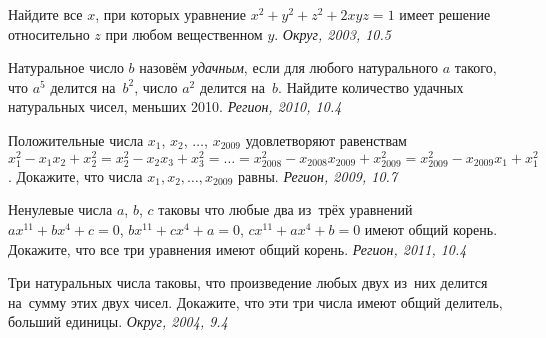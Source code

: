 \begin{problems}

\item
Найдите все $x$, при которых уравнение $x^2 + y^2 + z^2 + 2 x y z = 1$
имеет решение относительно $z$ при любом вещественном $y$.
\emph{\small Округ, 2003, 10.5}

\item
Натуральное число $b$ назовём \emph{удачным}, если для любого натурального $a$
такого, что $a^5$ делится на~$b^2$, число $a^2$ делится на~$b$.
Найдите количество удачных натуральных чисел, меньших 2010.
\emph{\small Регион, 2010, 10.4}

\item
Положительные числа $x_1$, $x_2$, $\ldots$, $x_{2009}$ удовлетворяют равенствам
\(
    x_1^2 - x_1 x_2 + x_2^2
=
    x_2^2 - x_2 x_3 + x_3^2
= \ldots =
    x_{2008}^2 - x_{2008} x_{2009} + x_{2009}^2
=
    x_{2009}^2 - x_{2009} x_1 + x_1^2
\).
Докажите, что числа $x_1, x_2, \ldots, x_{2009}$ равны.
\emph{\small Регион, 2009, 10.7}

\item
Ненулевые числа $a$, $b$, $c$ таковы что любые два из~трёх уравнений
$a x^{11} + b x^4 + c = 0$, $b x^{11} + c x^4 + a = 0$,
$c x^{11} + a x^4 + b = 0$ имеют общий корень.
Докажите, что все три уравнения имеют общий корень.
\emph{\small Регион, 2011, 10.4}

\item
Три натуральных числа таковы, что произведение любых двух из~них делится
на~сумму этих двух чисел.
Докажите, что эти три числа имеют общий делитель, больший единицы.
\emph{\small Округ, 2004, 9.4}

\end{problems}

